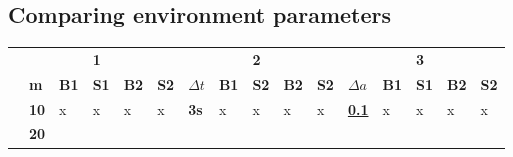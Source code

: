 \subsection{Comparing environment parameters}
\begin{table}[H]
\begin{tabular}{l|lllll|llllllllll|}
\cline{2-16}
                                          &                                        &                                  & \textbf{1}                       & \textbf{}                        &             &                                         &                                  & \textbf{2}                       & \textbf{}                        & \multicolumn{1}{l|}{}            &                                         &                                  & \textbf{3}                       &                                  &             \\ \cline{2-16} 
                                          & \multicolumn{1}{l|}{\textbf{m}}       & \multicolumn{1}{l|}{\textbf{B1}} & \multicolumn{1}{l|}{\textbf{S1}} & \multicolumn{1}{l|}{\textbf{B2}} & \textbf{S2} & \multicolumn{1}{l|}{\textbf{$\Delta{t}$}}        & \multicolumn{1}{l|}{\textbf{B1}} & \multicolumn{1}{l|}{\textbf{S2}} & \multicolumn{1}{l|}{\textbf{B2}} & \multicolumn{1}{l|}{\textbf{S2}} & \multicolumn{1}{l|}{\textbf{$\Delta{a}$}}        & \multicolumn{1}{l|}{\textbf{B1}} & \multicolumn{1}{l|}{\textbf{S1}} & \multicolumn{1}{l|}{\textbf{B2}} & \textbf{S2} \\ \hline
\multicolumn{1}{|l|}{\textbf{}}           & \multicolumn{1}{l|}{\textbf{10}}       & \multicolumn{1}{l|}{x}           & \multicolumn{1}{l|}{x}           & \multicolumn{1}{l|}{x}           & x           & \multicolumn{1}{l|}{\textbf{3s}}        & \multicolumn{1}{l|}{x}           & \multicolumn{1}{l|}{x}           & \multicolumn{1}{l|}{x}           & \multicolumn{1}{l|}{x}           & \multicolumn{1}{l|}{{\ul \textbf{0.1}}} & \multicolumn{1}{l|}{x}           & \multicolumn{1}{l|}{x}           & \multicolumn{1}{l|}{x}           & x           \\ \cline{2-16} 
\multicolumn{1}{|l|}{\textbf{}}           & \multicolumn{1}{l|}{\textbf{20}}       & \multicolumn{1}{l|}{}            & \multicolumn{1}{l|}{}            & \multicolumn{1}{l|}{}            &             &                                         &                                  &                                  &                                  &                                  &                                         &                                  &                                  &                                  &             \\ \cline{2-16} 

\end{tabular}
\end{table}
